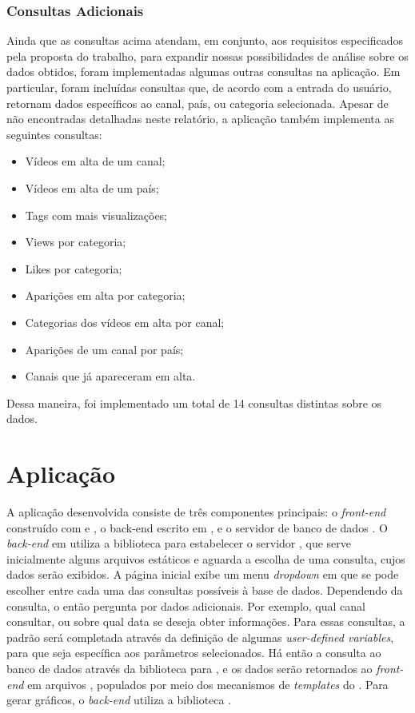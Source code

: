 \subsection{Consultas Adicionais}

  Ainda que as consultas acima atendam, em conjunto, aos requisitos especificados pela proposta do trabalho, para expandir nossas
  possibilidades de análise sobre os dados obtidos, foram implementadas algumas outras consultas na aplicação. Em particular,
  foram incluídas consultas que, de acordo com a entrada do usuário, retornam dados específicos ao canal, país, ou categoria
  selecionada. Apesar de não encontradas detalhadas neste relatório, a aplicação  também implementa as seguintes consultas:
  \begin{itemize}
    \item Vídeos em alta de um canal;
    \item Vídeos em alta de um país;
    \item Tags com mais visualizações;
    \item Views por categoria;
    \item Likes por categoria;
    \item Aparições em alta por categoria;
    \item Categorias dos vídeos em alta por canal;
    \item Aparições de um canal por país;
    \item Canais que já apareceram em alta.
  \end{itemize}

  Dessa maneira, foi implementado um total de 14 consultas distintas sobre os dados.

\chapter{Aplicação}

  A aplicação desenvolvida consiste de três componentes principais: o \emph{front-end} construído com
   e ,
  o back-end escrito em , e o servidor de banco de dados . O \emph{back-end} em 
  utiliza a biblioteca
   para estabelecer o servidor , que serve inicialmente alguns arquivos estáticos e aguarda a escolha de uma
  consulta, cujos dados serão exibidos. A página inicial exibe um menu \emph{dropdown} em que se pode escolher entre cada
  uma das consultas possíveis à base de dados. Dependendo da consulta, o  então pergunta por dados adicionais. Por exemplo,
  qual canal consultar, ou sobre qual data se deseja obter informações. Para essas consultas, a  padrão será
  completada através da definição de algumas \emph{user-defined variables}, para que seja específica aos parâmetros
  selecionados. Há então a consulta ao banco de dados através da biblioteca  para , e os dados
  serão retornados ao \emph{front-end} em arquivos , populados por meio dos mecanismos de \emph{templates} do .
  Para gerar gráficos, o \emph{back-end} utiliza a biblioteca .

